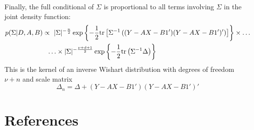 \documentclass{article} %
\begin{document}
Finally, the full conditional of $\Sigma$ is proportional to all terms involving $\Sigma$ in the joint density function:
\begin{align*}
p(\Sigma|D,A,B)&\propto\ \vert\Sigma\vert^{-\frac{n}{2}}\exp\left\{-\frac{1}{2}\tr\left[\Sigma^{-1}\left((Y-AX-B1')(Y-AX-B1')'\right)\right]\right\}\times\ldots\\
&~~\ldots\times\vert\Sigma\vert^{-\frac{\nu+d+1}{2}}\exp\left\{-\frac{1}{2}\tr\left(\Sigma^{-1}\Delta\right)\right\}
\end{align*}
This is the kernel of an inverse Wishart distribution with degrees of freedom $\nu+n$ and scale matrix
\[\Delta_n=\Delta+(Y-AX-B1')(Y-AX-B1')'\]

\clearpage
\section{References}


\end{document}
